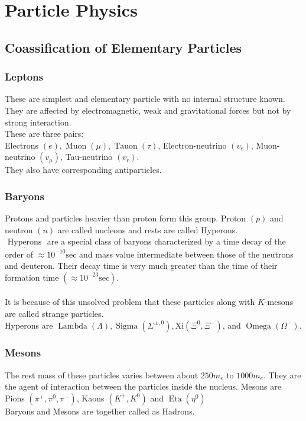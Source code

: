 \chapter{Particle Physics}
\section{Coassification of Elementary Particles}
\subsection{Leptons}
These are simplest and elementary particle with no internal structure known. They are  affected by electromagnetic, weak and gravitational forces but not by strong interaction.\\
These are three pairs:\\
Electrons $(e), \operatorname{Muon}(\mu), \operatorname{Tauon}(\tau)$, Electron-neutrino $\left(v_e\right)$, Muon-neutrino $\left(v_\mu\right)$,
Tau-neutrino $\left(v_r\right)$.\\
They also have corresponding antiparticles.
\subsection{Baryons}
Protons and particles heavier than proton form this group. Proton $(p)$ and neutron $(n)$ are called nucleons and rests are called Hyperons.\\
$\underline{\text { Hyperons }}$ are a special class of baryons characterized by a time decay of the order of $\approx 10^{-10} \mathrm{sec}$ and mass value intermediate between those of the neutrons and deuteron. Their decay time is very much greater than the time of their formation time $\left(\approx 10^{-23} \mathrm{sec}\right)$.\\\\
It is because of this unsolved problem that these particles along with $K$-mesons are called strange particles.\\
Hyperons are $\operatorname{Lambda}(\Lambda), \operatorname{Sigma}\left(\Sigma^{\pm, 0}\right), \mathrm{Xi}\left(\Xi^0, \Xi^{-}\right)$, and $\operatorname{Omega}\left(\Omega^{-}\right)$.
\subsection{Mesons}
The rest mass of these particles varies between about $250 m_e$ to $1000 m_e$. They are the agent of interaction between the particles inside the nucleus. Mesons are Pions $\left(\pi^{+}, \pi^0, \pi^{-}\right)$, Kaons $\left(K^{+}, K^0\right)$ and $\operatorname{Eta}\left(\eta^0\right)$\\
Baryons and Mesons are together called as Hadrons.
